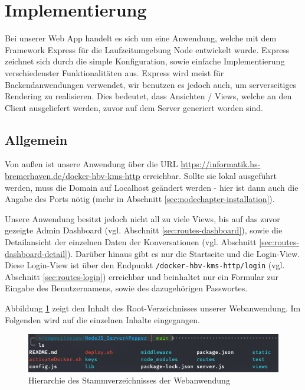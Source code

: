 \newpage
\section{Implementierung}
\label{sec:nodechapter-implementation}
Bei unserer Web App handelt es sich um eine Anwendung, welche mit dem Framework Express für die Laufzeitumgebung Node entwickelt wurde. Express zeichnet sich durch die simple Konfiguration, sowie einfache Implementierung verschiedenster Funktionalitäten aus. Express wird meist für Backendanwendungen verwendet, wir benutzen es jedoch auch, um serverseitiges Rendering zu realisieren. Dies bedeutet, dass Ansichten / Views, welche an den Client ausgeliefert werden, zuvor auf dem Server generiert worden sind.\\

\subsection{Allgemein}
Von außen ist unsere Anwendung über die URL
\href{https://informatik.hs-bremerhaven.de/docker-hbv-kms-http}{https://informatik.hs-bremerhaven.de/docker-hbv-kms-http} erreichbar. Sollte sie lokal ausgeführt werden, muss die Domain auf Localhost geändert werden - hier ist dann auch die Angabe des Ports nötig (mehr in Abschnitt \ref{sec:nodechapter-installation}).

Unsere Anwendung besitzt jedoch nicht all zu viele Views, bis auf das zuvor gezeigte Admin Dashboard (vgl. Abschnitt \ref{sec:routes-dashboard}), sowie die Detailansicht der einzelnen Daten der Konversationen (vgl. Abschnitt \ref{sec:routes-dashboard-detail}). Darüber hinaus gibt es nur die Startseite und die Login-View. Diese Login-View ist über den Endpunkt \verb|/docker-hbv-kms-http/login| (vgl. Abschnitt \ref{sec:routes-login}) erreichbar und beinhaltet nur ein Formular zur Eingabe des Benutzernamens, sowie des dazugehörigen Passwortes.

Abbildung \ref{fig:webhierarchie} zeigt den Inhalt des Root-Verzeichnisses unserer Webanwendung. Im Folgenden wird auf die einzelnen Inhalte eingegangen. \\

\begin{figure}[H]
    \includegraphics[width=\textwidth]{Figures/NodeChapter/ServerFileStructure.png}
    \caption{Hierarchie des Stammverzeichnisses der Webanwendung}
    \label{fig:webhierarchie}
    \centering
\end{figure}

